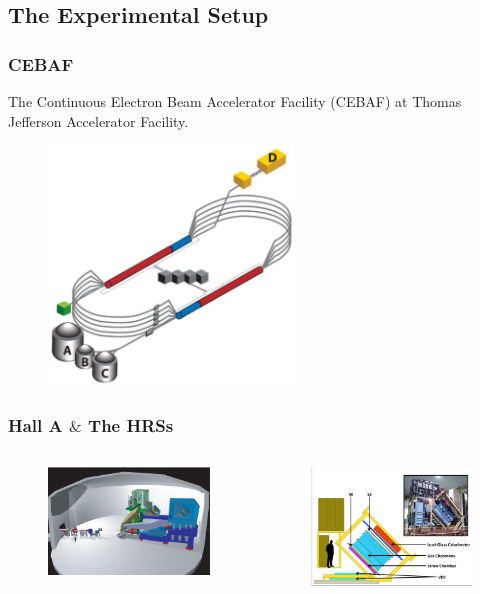 \documentclass[12pt]{beamer}
\begin{document}
\subsection[Experiment]{The Experimental Setup}
\begin{frame}
\frametitle{CEBAF}

The Continuous Electron Beam Accelerator Facility (CEBAF) at Thomas Jefferson Accelerator Facility.
\vspace{-20pt}
\begin{figure}
	\includegraphics[width=6.5cm]{../images/cebaf.pdf}
\end{figure}

\end{frame}
\begin{frame}
\frametitle{Hall A $\&$ The HRSs}


\vspace{-20pt}
\begin{columns}
\begin{figure}
	\includegraphics[width=6cm]{../images/halla.pdf}
\end{figure}
\begin{figure}
	\includegraphics[width=6cm]{../images/HRS_cartoon}
\end{figure}

\end{columns}
\end{frame}
\end{document}
